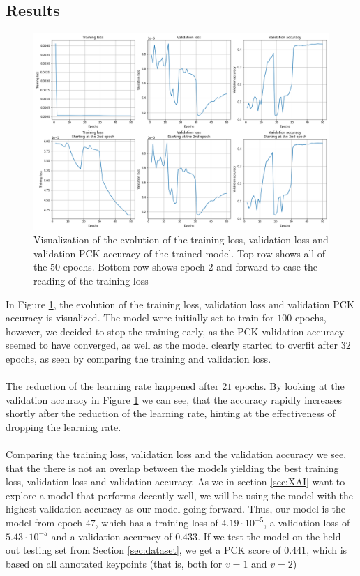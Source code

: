 \documentclass[./main.tex]{subfiles}
\begin{document}
\subsection{Results}\label{subsec:results}
\begin{figure}[htbp]
    \centering
    \includegraphics[width = \textwidth]{entities/results.png}
    \caption{Visualization of the evolution of the training loss, validation loss and validation PCK accuracy of the trained model. Top row shows all of the $50$ epochs. Bottom row shows epoch $2$ and forward to ease the reading of the training loss}
    \label{fig:results}
\end{figure}
\noindent In Figure \ref{fig:results}, the evolution of the training loss, validation loss and validation PCK accuracy is visualized. The model were initially set to train for $100$ epochs, however, we decided to stop the training early, as the PCK validation accuracy seemed to have converged, as well as the model clearly started to overfit after $32$ epochs, as seen by comparing the training and validation loss.
\\
\\
The reduction of the learning rate happened after $21$ epochs. By looking at the validation accuracy in Figure \ref{fig:results} we can see, that the accuracy rapidly increases shortly after the reduction of the learning rate, hinting at the effectiveness of dropping the learning rate. 
\\
\\
Comparing the training loss, validation loss and the validation accuracy we see, that the there is not an overlap between the models yielding the best training loss, validation loss and validation accuracy. As we in section \ref{sec:XAI} want to explore a model that performs decently well, we will be using the model with the highest validation accuracy as our model going forward. Thus, our model is the model from epoch $47$, which has a training loss of $4.19 \cdot 10^{-5}$, a validation loss of $5.43 \cdot 10^{-5}$ and a validation accuracy of $0.433$. If we test the model on the held-out testing set from Section \ref{sec:dataset}, we get a PCK score of $0.441$, which is based on all annotated keypoints (that is, both for $v = 1$ and $v = 2$)
\end{document}
